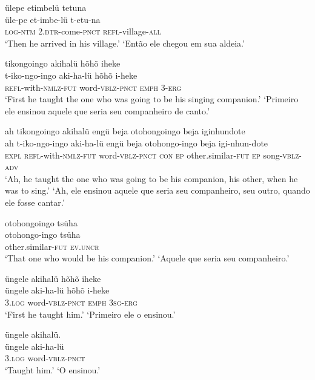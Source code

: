 \documentclass[output=paper,
modfonts,nonflat
]{langsci/langscibook}
\begin{document}
\ea  ülepe etimbelü tetuna\\[.3em]
\gll üle-pe et-imbe-lü t-etu-na\\
     \textsc{log}-\textsc{ntm} \textsc{2.dtr}-come-\textsc{pnct} \textsc{refl}-village-\textsc{all}\\
\glt ‘Then he arrived in his village.’
\glt ‘Então ele chegou em sua aldeia.’
\z

\ea  tikongoingo akihalü hõhõ iheke\\[.3em]
\gll t-iko-ngo-ingo aki-ha-lü hõhõ i-heke\\
     \textsc{refl}-with-\textsc{nmlz}-\textsc{fut} word-\textsc{vblz}-\textsc{pnct} \textsc{emph} 3-\textsc{erg}\\
\glt ‘First he taught the one who was going to be his singing companion.’
\glt ‘Primeiro ele ensinou aquele que seria seu companheiro de canto.’
\z

\ea  ah tikongoingo akihalü engü beja otohongoingo beja iginhundote\\[.3em]
\gll ah t-iko-ngo-ingo aki-ha-lü engü beja otohongo-ingo beja igi-nhun-dote\\
     \textsc{expl} \textsc{refl}-with-\textsc{nmlz}-\textsc{fut} word-\textsc{vblz}-\textsc{pnct} \textsc{con} \textsc{ep} other.similar-\textsc{fut} \textsc{ep} song-\textsc{vblz}-\textsc{adv}\\
\glt ‘Ah, he taught the one who was going to be his companion, his other, when he was to sing.’
\glt ‘Ah, ele ensinou aquele que seria seu companheiro, seu outro, quando ele fosse cantar.’
\z


\newpage 
\ea  otohongoingo tsüha\\[.3em]
\gll otohongo-ingo tsüha\\
     other.similar-\textsc{fut} \textsc{ev.uncr}\\
\glt ‘That one who would be his companion.’
\glt ‘Aquele que seria seu companheiro.’
\z

\ea  üngele akihalü hõhõ iheke\\[.3em]
\gll üngele aki-ha-lü hõhõ i-heke\\
     \textsc{3.log} word-\textsc{vblz}-\textsc{pnct} \textsc{emph} \textsc{3sg}-\textsc{erg}\\
\glt ‘First he taught him.’
\glt ‘Primeiro ele o ensinou.’
\z

\ea  üngele akihalü.\\[.3em]
\gll üngele aki-ha-lü\\
     \textsc{3.log} word-\textsc{vblz}-\textsc{pnct}\\
\glt ‘Taught him.’
\glt ‘O ensinou.’
\z
\end{document}
